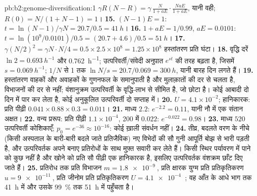 \begin{solution}{pb:b2:genome-diversification:1}
$\gamma R(N - R) = \gamma\,\frac{N}{1 + aE}\cdot\frac{NaE}{1 + aE}$,
यानी वही; $R(0) = N/(1 + N - 1) = 1$।
\textbf{15.} $(N - 1)E = 1$: $t = \ln(N - 1)/\gamma N = 20.7/0.5 =
\qty{41}{h}$।
\textbf{16.} $1 + aE = 1/0.99$, $aE = 0.0101$: $t = \ln(10^{9}/0.0101)
/0.5 = (20.7 + 4.6)/0.5 = \qty{51}{h}$।
\textbf{17.} $\gamma (N/2)^2 = \gamma N\cdot N/4 = 0.5\times 2.5\times
10^{8} = 1.25\times 10^{8}$ हस्तांतरण प्रति घंटा।
\textbf{18.} वृद्धि दरें $\ln 2 = \qty{0.693}{h^{-1}}$ और
\qty{0.762}{h^{-1}}; उत्परिवर्ती/संवेदी अनुपात $e^{st}$ की तरह बढ़ता है,
जिसमें $s = \qty{0.069}{h^{-1}}$; $1/N$ से 1 तक $\ln N/s =
20.7/0.069 = \qty{300}{h}$, यानी बारह दिन लगते हैं।
\textbf{19.} हस्तांतरण वाहकों और अवाहकों के गुणनफल के समानुपाती है और
मुलाक़ातों की दर से चलता है, विभाजनों की दर से नहीं; वंशानुक्रम
उत्परिवर्ती के वृद्धि-लाभ से सीमित है, जो छोटा है।
कोई  आबादी दो दिन में पार कर लेता है, कोई अनुकूलित उत्परिवर्ती
दो सप्ताह में।
\textbf{20.} $U = 4.1\times 10^{-2}$; हानिकारक: प्रति पीढ़ी $0.041\times 0.88\times
0.3 = 0.011$।
\textbf{21.} माध्य $2.2$: $e^{-2.2} = 0.11$, यानी नौ में एक संतान
अक्षत।
\textbf{22.} वन्य प्ररूप: प्रति पीढ़ी $1.1\times 10^{-4}$, 200 में $0.022$:
$e^{-0.022} = 0.98$।
\textbf{23.} माध्य $520$ उत्परिवर्ती कोशिकाएँ; $p_0 = e^{-36} \approx
10^{-16}$: कोई ख़ाली संवर्धन नहीं।
\textbf{24.} तीव्र, बदलते वरण के नीचे (किसी अस्पताल के बारी-बारी बदले
जाते प्रतिजैविक) नए विभेदों की सौ गुनी आपूर्ति बोझ से भारी पड़ती है, और
उत्परिवर्तक अपने बनाए प्रतिरोधों के साथ मुफ़्त सवारी कर लेते हैं। किसी
स्थिर पर्यावरण में पाने को कुछ नहीं है और खोने को प्रति सौ पीढ़ी एक
हानिकारक  है, इसलिए उत्परिवर्तक वंशक्रम छाँट दिए जाते हैं।
\textbf{25.} प्रतिरोध तक प्रति विभाजन $m = \qty{1.8e-9}{}$, प्रति
क्षारक युग्म प्रति प्रतिकृतिकरण $u =
\qty{9e-11}{}$, प्रति जीनोम प्रति प्रतिकृतिकरण $U = \qty{4.1e-4}{}$
; वह  आँत के आधे
भाग तक \qty{41}{h} में और उसके \qty{99}{\%} तक \qty{51}{h} में पहुँचता है।
\end{solution}
